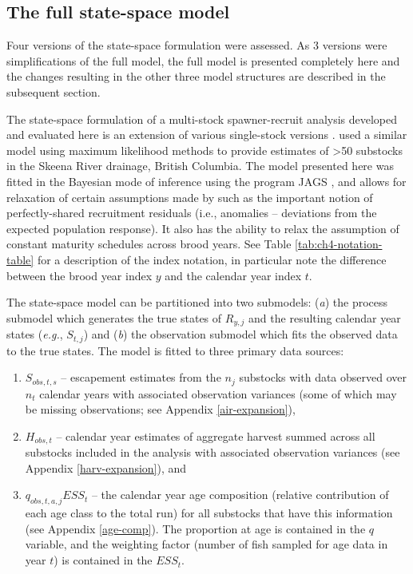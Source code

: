 \documentclass[12pt,]{book}
\theoremstyle{definition}
\theoremstyle{definition}
\theoremstyle{definition}
\theoremstyle{remark}
\begin{document}
\subsection{The full state-space model}\label{ssm-model}

\noindent
Four versions of the state-space formulation were assessed. As 3
versions were simplifications of the full model, the full model is
presented completely here and the changes resulting in the other three
model structures are described in the subsequent section.

The state-space formulation of a multi-stock spawner-recruit analysis
developed and evaluated here is an extension of various single-stock
versions \citep[\emph{e.g.},][]{fleischman-etal-2013}.
\citet{walters-etal-2008} used a similar model using maximum likelihood
methods to provide estimates of \textgreater{}50 substocks in the Skeena
River drainage, British Columbia. The model presented here was fitted in
the Bayesian mode of inference using the program JAGS
\citep{plummer-2017}, and allows for relaxation of certain assumptions
made by \citet{walters-etal-2008} such as the important notion of
perfectly-shared recruitment residuals (i.e., anomalies -- deviations
from the expected population response). It also has the ability to relax
the assumption of constant maturity schedules across brood years. See
Table \ref{tab:ch4-notation-table} for a description of the index
notation, in particular note the difference between the brood year index
\(y\) and the calendar year index \(t\).

The state-space model can be partitioned into two submodels: (\emph{a})
the process submodel which generates the true states of \(R_{y,j}\) and
the resulting calendar year states (\emph{e.g.}, \(S_{t,j}\)) and
(\emph{b}) the observation submodel which fits the observed data to the
true states. The model is fitted to three primary data sources:

\begin{enumerate}
\def\labelenumi{(\arabic{enumi})}
\item
  \(S_{obs,t,s}\) -- escapement estimates from the \(n_j\) substocks
  with data observed over \(n_t\) calendar years with associated
  observation variances (some of which may be missing observations; see
  Appendix \ref{air-expansion}),
\item
  \(H_{obs,t}\) -- calendar year estimates of aggregate harvest summed
  across all substocks included in the analysis with associated
  observation variances (see Appendix \ref{harv-expansion}), and
\item
  \(q_{obs,t,a,j} ESS_t\) -- the calendar year age composition (relative
  contribution of each age class to the total run) for all substocks
  that have this information (see Appendix \ref{age-comp}). The
  proportion at age is contained in the \(q\) variable, and the
  weighting factor (number of fish sampled for age data in year \(t\))
  is contained in the \(ESS_t\).
\end{enumerate}
\end{document}
